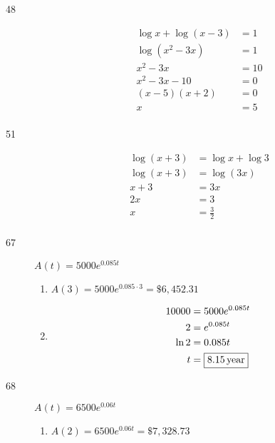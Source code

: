\documentclass{exam}
\begin{document}
\begin{description}
      \item[48] 
        \begin{align*}
          \log x + \log (x - 3)        &= 1 \\
          \log \left( x^2 - 3x \right) &= 1 \\
          x^2 - 3x                     &= 10 \\
          x^2 - 3x - 10                &= 0 \\
          (x - 5)(x + 2)               &= 0 \\
          x                            &= \boxed{5} \\
        \end{align*}

      \item[51] 
        \begin{align*}
          \log (x + 3) &= \log x + \log 3 \\
          \log (x + 3) &= \log (3x) \\
           x + 3       &= 3x \\
           2x          &= 3 \\
           x           &= \boxed{\frac{3}{2}} \\
        \end{align*}

      \item[67]
        $A(t) = 5000 e^{0.085 t}$

        \begin{enumerate}[a]
          \item $A(3) = 5000 e^{0.085 \cdot 3} = \boxed{\$6,452.31}$

          \item
            \begin{align*}
              10000 &= 5000 e^{0.085 t} \\
              2     &= e^{0.085 t} \\
              \ln 2 &= 0.085t \\
              t     &= \boxed{\unit[8.15]{year}} \\
            \end{align*}
        \end{enumerate}

      \item[68]
        $A(t) = 6500 e^{0.06 t}$

        \begin{enumerate}[a]
          \item $A(2) = 6500 e^{0.06 t} = \boxed{\$7,328.73}$


\end{enumerate}
\end{description}
\end{document}
